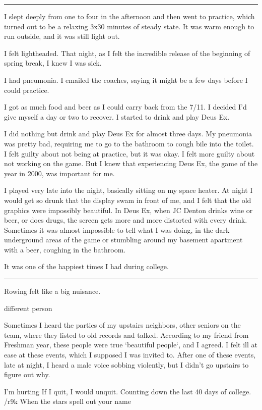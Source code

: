 \plainfancybreak{12pt}{2}{* * *}

I slept deeply from one to four in the afternoon and then went to practice,
which turned out to be a relaxing 3x30 minutes of steady state.  It was warm
enough to run outside, and it was still light out.

I felt lightheaded.  That night, as I felt the incredible release of the
beginning of spring break, I knew I was sick.  

I had pneumonia.  I emailed the coaches, saying it might be a few days before I
could practice.

I got as much food and beer as I could carry back from the 7/11.  I decided I'd
give myself a day or two to recover.  I started to drink and play Deus Ex.  

I did nothing but drink and play Deus Ex for almost three days.  My pneumonia
was pretty bad, requiring me to go to the bathroom to cough bile into the
toilet.  I felt guilty about not being at practice, but it was okay.  I felt
more guilty about not working on the game.  But I knew that experiencing Deus
Ex, the game of the year in 2000, was important for me.

I played very late into the night, basically sitting on my space heater.  At
night I would get so drunk that the display swam in front of me, and I felt that
the old graphics were impossibly beautiful.  In Deus Ex, when JC Denton drinks
wine or beer, or does drugs, the screen gets more and more distorted with every
drink.  Sometimes it was almost impossible to tell what I was doing, in the dark
underground areas of the game or stumbling around my basement apartment with a
beer, coughing in the bathroom.

It was one of the happiest times I had during college.

\plainfancybreak{12pt}{2}{* * *}

Rowing felt like a big nuisance.

different person

Sometimes I heard the parties of my upstairs neighbors, other seniors on the
team, where they listed to old records and talked.  According to my friend from
Freshman year, these people were true `beautiful people`, and I agreed.  I felt
ill at ease at these events, which I supposed I was invited to.  After one of
these events, late at night, I heard a male voice sobbing violently, but I
didn't go upstairs to figure out why.

I'm hurting
If I quit, I would unquit.
Counting down the last 40 days of college.
/r9k
When the stars spell out your name

